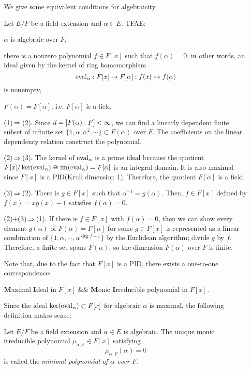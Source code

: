\documentclass{../exp}
\begin{document}
We give some equivalent conditions for algebraicity.
\begin{thm}
Let $E/F$ be a field extension and $\alpha\in E$.
TFAE:
\begin{cond}
\item $\alpha$ is algebraic over $F$,
\item there is a nonzero polynomial $f\in F[x]$ such that $f(\alpha)=0$, in other words, an ideal given by the kernel of ring homomorphism
\[\eval_\alpha:F[x]\to F[\alpha]:f(x)\mapsto f(\alpha)\]
is nonempty,
\item $F(\alpha)=F[\alpha]$, i.e. $F[\alpha]$ is a field.
\end{cond}
\end{thm}
\begin{pf}
(1)$\impl$(2).
Since $d=[F(\alpha):F]<\infty$, we can find a linearly dependent finite subset of infinite set $\{1,\alpha,\alpha^2,\cdots\}\subset F(\alpha)$ over $F$.
The coefficients on the linear dependency relation construct the polynomial.

(2)$\impl$(3).
The kernel of $\operatorname{eval}_\alpha$ is a prime ideal because the quotient $F[x]/\ker(\operatorname{eval}_\alpha)\cong\operatorname{im}(\operatorname{eval}_\alpha)=F[\alpha]$ is an integral domain.
It is also maximal since $F[x]$ is a PID(Krull dimension 1).
Therefore, the quotient $F[\alpha]$ is a field.

(3)$\impl$(2).
There is $g\in F[x]$ such that $\alpha^{-1}=g(\alpha)$.
Then, $f\in F[x]$ defined by $f(x)=xg(x)-1$ satisfies $f(\alpha)=0$.

(2)$+$(3)$\impl$(1).
If there is $f\in F[x]$ with $f(\alpha)=0$, then we can show every element $g(\alpha)$ of $F(\alpha)=F[\alpha]$ for some $g\in F[x]$ is represented as a linear combination of $\{1,\alpha,\cdots,\alpha^{\deg f-1}\}$ by the Euclidean algorithm; divide $g$ by $f$.
Therefore, a finite set spans $F(\alpha)$, so the dimension $F(\alpha)$ over $F$ is finite.
\end{pf}

Note that, due to the fact that $F[x]$ is a PID, there exists a one-to-one correspondence:
\begin{rd}
\textbf{M}aximal \textbf{I}deal in $F[x]$ &\quad& \textbf{M}onic \textbf{I}rreducible polynomial in $F[x]$. 
\end{rd}
Since the ideal $\ker(\operatorname{eval}_\alpha)\subset F[x]$ for algebraic $\alpha$ is maximal, the following definition makes sense:

\begin{defn}
Let $E/F$ be a field extension and $\alpha\in E$ is algebraic.
The unique monic irreducible polynomial $\mu_{\alpha,F}\in F[x]$ satisfying 
\[\mu_{\alpha,F}(\alpha)=0\]
is called the \emph{minimal polynomial of $\alpha$ over $F$}.
\end{defn}
\end{document}
